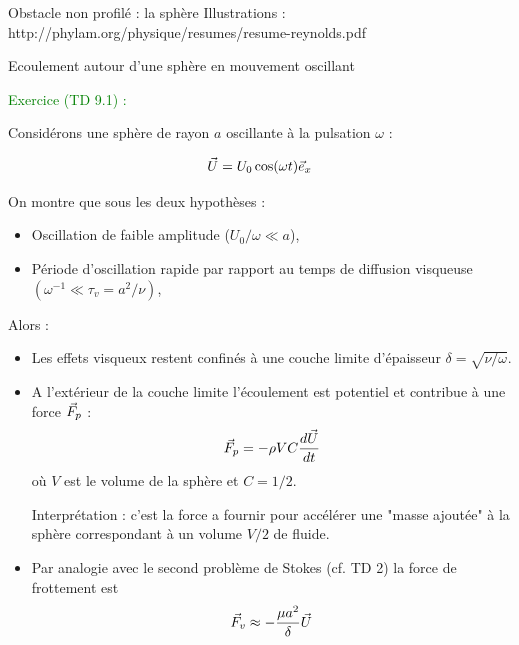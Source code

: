 {\begin{frame}{Obstacle non profilé : la sphère}
Illustrations : 
http://phylam.org/physique/resumes/resume-reynolds.pdf 

\end{frame}




\begin{frame}{Ecoulement autour d'une sphère en mouvement oscillant}
\small

\textcolor{green}{Exercice (TD 9.1) : } 

Considérons une sphère de rayon $a$ oscillante à la pulsation $\omega$ :

$$\vec{U} = U_0 \cos  (\omega t) \vec{e}_x$$ 


On montre que sous les deux hypothèses :
\begin{itemize}
\item Oscillation de faible amplitude  ($U_0/\omega \ll a$),

\item Période d'oscillation rapide par rapport au temps de diffusion visqueuse  $(\omega^{-1} \ll \tau_v = a^2 / \nu )$,
\end{itemize}

Alors :

\begin{itemize}

\item 
Les effets visqueux restent confinés à une couche limite d'épaisseur $\delta = \sqrt{\nu/\omega}$.


\item 
A l'extérieur de la couche limite l'écoulement est potentiel et contribue à une force $\vec{F}_p$ :
$$
\vec{F}_p = - \rho V C \frac{d \vec{U}}{d t} 
$$
où $V$ est le volume de la sphère et $C = 1/2$.

Interprétation : c'est la force a fournir pour accélérer une "masse ajoutée" à la sphère 
correspondant à un volume $V/2$ de fluide.

\item
Par analogie avec le second problème de Stokes (cf. TD 2) la force de frottement est 
$$
\vec{F}_v  \approx - \frac{\mu a^2}{\delta} \vec{U} 
$$

\end{itemize}

\end{frame}
}

